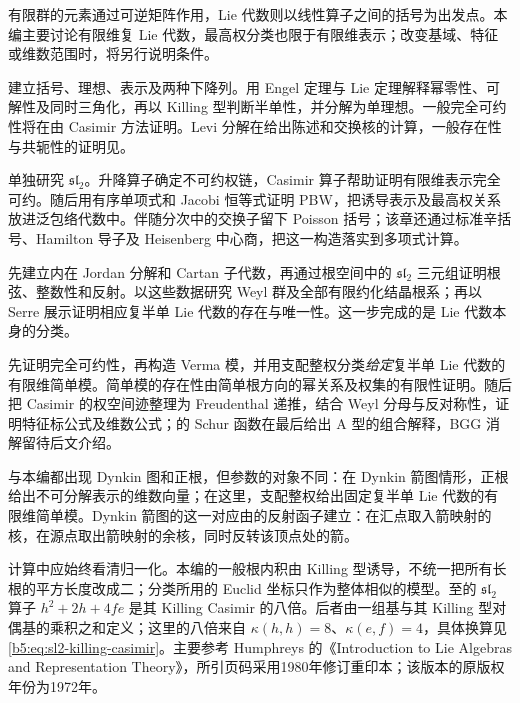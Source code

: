 
\BookPartGuide
有限群的元素通过可逆矩阵作用，Lie 代数则以线性算子之间的括号为出发点。本编主要讨论有限维复 Lie 代数，最高权分类也限于有限维表示；改变基域、特征或维数范围时，将另行说明条件。

\ProseParagraphBreak
{}建立括号、理想、表示及两种下降列。用 Engel 定理与 Lie 定理解释幂零性、可解性及同时三角化，再以 Killing 型判断半单性，并分解为单理想。一般完全可约性将在由 Casimir 方法证明。Levi 分解在给出陈述和交换核的计算，一般存在性与共轭性的证明见。

\ProseParagraphBreak
{}单独研究 \(\mathfrak{sl}_2\)。升降算子确定不可约权链，Casimir 算子帮助证明有限维表示完全可约。随后用有序单项式和 Jacobi 恒等式证明 PBW，把诱导表示及最高权关系放进泛包络代数中。伴随分次中的交换子留下 Poisson 括号；该章还通过标准辛括号、Hamilton 导子及 Heisenberg 中心商，把这一构造落实到多项式计算。

\ProseParagraphBreak
{}先建立内在 Jordan 分解和 Cartan 子代数，再通过根空间中的 \(\mathfrak{sl}_2\) 三元组证明根弦、整数性和反射。以这些数据研究 Weyl 群及全部有限约化结晶根系；再以 Serre 展示证明相应复半单 Lie 代数的存在与唯一性。这一步完成的是 Lie 代数本身的分类。

\ProseParagraphBreak
{}先证明完全可约性，再构造 Verma 模，并用支配整权分类\emph{给定}复半单 Lie 代数的有限维简单模。简单模的存在性由简单根方向的幂关系及权集的有限性证明。随后把 Casimir 的权空间迹整理为 Freudenthal 递推，结合 Weyl 分母与反对称性，证明特征标公式及维数公式；的 Schur 函数在最后给出 A 型的组合解释，BGG 消解留待后文介绍。

\ProseParagraphBreak
{}与本编都出现 Dynkin 图和正根，但参数的对象不同：在 Dynkin 箭图情形，正根给出不可分解表示的维数向量；在这里，支配整权给出固定复半单 Lie 代数的有限维简单模。Dynkin 箭图的这一对应由的反射函子建立：在汇点取入箭映射的核，在源点取出箭映射的余核，同时反转该顶点处的箭。

\ProseParagraphBreak
计算中应始终看清归一化。本编的一般根内积由 Killing 型诱导，不统一把所有长根的平方长度改成二；分类所用的 Euclid 坐标只作为整体相似的模型。至的 \(\mathfrak{sl}_2\) 算子 \(h^2+2h+4fe\) 是其 Killing Casimir 的八倍。后者由一组基与其 Killing 型对偶基的乘积之和定义；这里的八倍来自 \(\kappa(h,h)=8\)、\(\kappa(e,f)=4\)，具体换算见\eqref{b5:eq:sl2-killing-casimir}。主要参考 Humphreys 的《Introduction to Lie Algebras and Representation Theory》\cite[Chapters II--VI]{Humphreys1972LieAlgebras}，所引页码采用1980年修订重印本；该版本的原版权年份为1972年。










